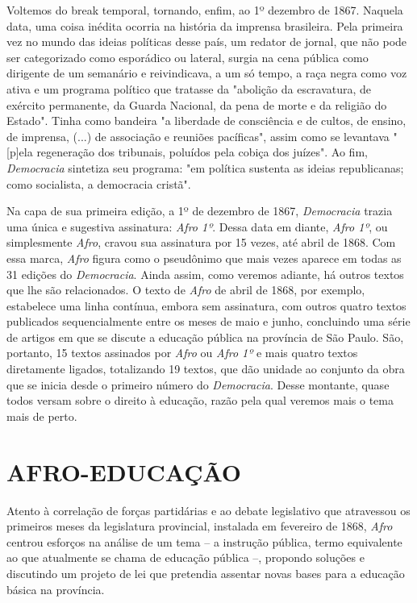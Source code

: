 Voltemos do break temporal, tornando, enfim, ao 1º dezembro de 1867.
Naquela data, uma coisa inédita ocorria na história da imprensa
brasileira. Pela primeira vez no mundo das ideias políticas desse país,
um redator de jornal, que não pode ser categorizado como esporádico ou
lateral, surgia na cena pública como dirigente de um semanário e
reivindicava, a um só tempo, a raça negra como voz ativa e um programa
político que tratasse da "abolição da escravatura, de exército
permanente, da Guarda Nacional, da pena de morte e da religião do
Estado". Tinha como bandeira "a liberdade de consciência e de cultos, de
ensino, de imprensa, (...) de associação e reuniões pacíficas", assim
como se levantava "{[}p{]}ela regeneração dos tribunais, poluídos pela
cobiça dos juízes". Ao fim, \emph{Democracia} sintetiza seu programa:
"em política sustenta as ideias republicanas; como socialista, a
democracia cristã".

Na capa de sua primeira edição, a 1º de dezembro de 1867,
\emph{Democracia} trazia uma única e sugestiva assinatura: \emph{Afro
1º}. Dessa data em diante, \emph{Afro 1º}, ou simplesmente \emph{Afro},
cravou sua assinatura por 15 vezes, até abril de 1868. Com essa marca,
\emph{Afro} figura como o pseudônimo que mais vezes aparece em todas as
31 edições do \emph{Democracia}. Ainda assim, como veremos adiante, há
outros textos que lhe são relacionados. O texto de \emph{Afro} de abril
de 1868, por exemplo, estabelece uma linha contínua, embora sem
assinatura, com outros quatro textos publicados sequencialmente entre os
meses de maio e junho, concluindo uma série de artigos em que se discute
a educação pública na província de São Paulo. São, portanto, 15 textos
assinados por \emph{Afro} ou \emph{Afro 1º} e mais quatro textos
diretamente ligados, totalizando 19 textos, que dão unidade ao conjunto
da obra que se inicia desde o primeiro número do \emph{Democracia}.
Desse montante, quase todos versam sobre o direito à educação, razão
pela qual veremos mais o tema mais de perto.

\section{AFRO-EDUCAÇÃO}

Atento à correlação de forças partidárias e ao debate legislativo que
atravessou os primeiros meses da legislatura provincial, instalada em
fevereiro de 1868, \emph{Afro} centrou esforços na análise de um tema --
a instrução pública, termo equivalente ao que atualmente se chama de
educação pública --, propondo soluções e discutindo um projeto de lei
que pretendia assentar novas bases para a educação básica na província.

